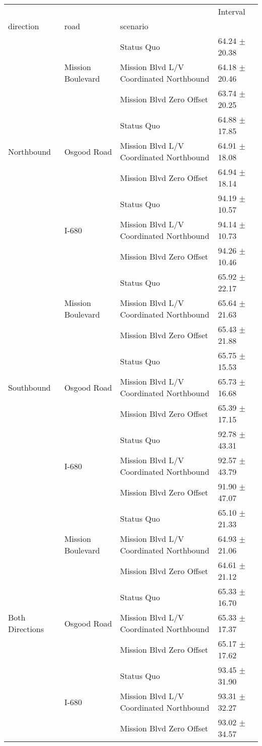 \begin{tabular}{llll}
\toprule
 &  &  & Interval \\
direction & road & scenario &  \\
\midrule
\multirow[t]{9}{*}{Northbound} & \multirow[t]{3}{*}{Mission Boulevard} & Status Quo & 64.24 $\pm$ 20.38 \\
 &  & Mission Blvd L/V Coordinated Northbound & 64.18 $\pm$ 20.46 \\
 &  & Mission Blvd Zero Offset & 63.74 $\pm$ 20.25 \\
 & \multirow[t]{3}{*}{Osgood Road} & Status Quo & 64.88 $\pm$ 17.85 \\
 &  & Mission Blvd L/V Coordinated Northbound & 64.91 $\pm$ 18.08 \\
 &  & Mission Blvd Zero Offset & 64.94 $\pm$ 18.14 \\
 & \multirow[t]{3}{*}{I-680} & Status Quo & 94.19 $\pm$ 10.57 \\
 &  & Mission Blvd L/V Coordinated Northbound & 94.14 $\pm$ 10.73 \\
 &  & Mission Blvd Zero Offset & 94.26 $\pm$ 10.46 \\
\multirow[t]{9}{*}{Southbound} & \multirow[t]{3}{*}{Mission Boulevard} & Status Quo & 65.92 $\pm$ 22.17 \\
 &  & Mission Blvd L/V Coordinated Northbound & 65.64 $\pm$ 21.63 \\
 &  & Mission Blvd Zero Offset & 65.43 $\pm$ 21.88 \\
 & \multirow[t]{3}{*}{Osgood Road} & Status Quo & 65.75 $\pm$ 15.53 \\
 &  & Mission Blvd L/V Coordinated Northbound & 65.73 $\pm$ 16.68 \\
 &  & Mission Blvd Zero Offset & 65.39 $\pm$ 17.15 \\
 & \multirow[t]{3}{*}{I-680} & Status Quo & 92.78 $\pm$ 43.31 \\
 &  & Mission Blvd L/V Coordinated Northbound & 92.57 $\pm$ 43.79 \\
 &  & Mission Blvd Zero Offset & 91.90 $\pm$ 47.07 \\
\multirow[t]{9}{*}{Both Directions} & \multirow[t]{3}{*}{Mission Boulevard} & Status Quo & 65.10 $\pm$ 21.33 \\
 &  & Mission Blvd L/V Coordinated Northbound & 64.93 $\pm$ 21.06 \\
 &  & Mission Blvd Zero Offset & 64.61 $\pm$ 21.12 \\
 & \multirow[t]{3}{*}{Osgood Road} & Status Quo & 65.33 $\pm$ 16.70 \\
 &  & Mission Blvd L/V Coordinated Northbound & 65.33 $\pm$ 17.37 \\
 &  & Mission Blvd Zero Offset & 65.17 $\pm$ 17.62 \\
 & \multirow[t]{3}{*}{I-680} & Status Quo & 93.45 $\pm$ 31.90 \\
 &  & Mission Blvd L/V Coordinated Northbound & 93.31 $\pm$ 32.27 \\
 &  & Mission Blvd Zero Offset & 93.02 $\pm$ 34.57 \\
\bottomrule
\end{tabular}
